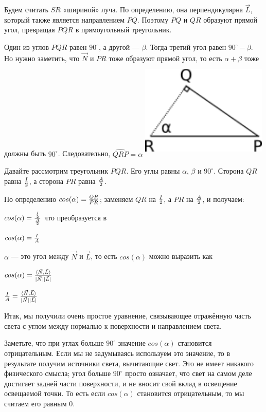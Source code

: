 Будем считать $SR$ «шириной» луча. По определению, она перпендикулярна $\vec{L}$, который также является направлением $PQ$. Поэтому $PQ$ и $QR$ образуют прямой угол, превращая $PQR$ в прямоугольный треугольник.

Один из углов $PQR$ равен $90^\circ$, а другой — $\beta$. Тогда третий угол равен $90^\circ - \beta$. Но нужно заметить, что $\vec{N}$ и $PR$ тоже образуют прямой угол, то есть $\alpha + \beta$ тоже должны быть $90^\circ$. Следовательно, $\widehat{QRP} = \alpha$
\includegraphics[width=6cm, height=4.8cm]{triangle.png}

Давайте рассмотрим треугольник $PQR$. Его углы равны $\alpha$, $\beta$ и $90^\circ$. Сторона $QR$ равна $I \over 2$, а сторона $PR$ равна $A \over 2$.

По определению $cos(\alpha) = {QR \over PR}$; заменяем $QR$ на $I \over 2$, а $PR$ на $A \over 2$, и получаем:

$cos(\alpha) = { {I \over 2} \over {A \over 2} }$  что преобразуется в

$cos(\alpha) = {I \over A}$

$\alpha$ — это угол между $\vec{N}$ и $\vec{L}$, то есть $cos(\alpha)$ можно выразить как

$cos(\alpha) = {{\langle \vec{N}, \vec{L} \rangle} \over {|\vec{N}||\vec{L}|}}$

${I \over A} = {{\langle \vec{N}, \vec{L} \rangle} \over {|\vec{N}||\vec{L}|}}$

Итак, мы получили очень простое уравнение, связывающее отражённую часть света с углом между нормалью к поверхности и направлением света.

Заметьте, что при углах больше $90^\circ$ значение $cos(\alpha)$ становится отрицательным. Если мы не задумываясь используем это значение, то в результате получим источники света, вычитающие свет. Это не имеет никакого физического смысла; угол больше $90^\circ$ просто означает, что свет на самом деле достигает задней части поверхности, и не вносит свой вклад в освещение освещаемой точки. То есть если $cos(\alpha)$ становится отрицательным, то мы считаем его равным $0$.

